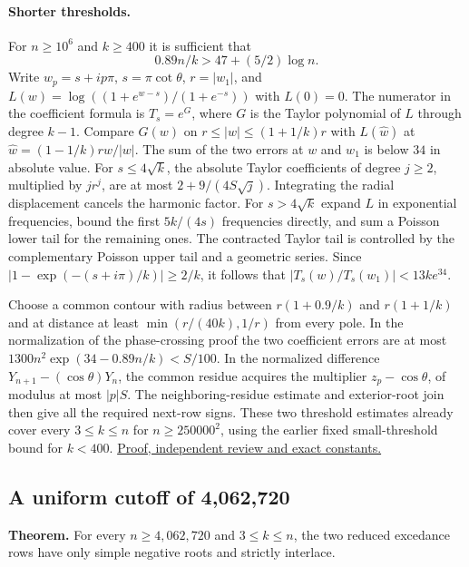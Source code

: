 \paragraph{Shorter thresholds.}
For $n\ge10^6$ and $k\ge400$ it is sufficient that
\[
0.89n/k>47+(5/2)\log n .
\]
Write $w_p=s+ip\pi$, $s=\pi\cot\theta$, $r=|w_1|$, and
$L(w)=\log((1+e^{w-s})/(1+e^{-s}))$ with $L(0)=0$.
The numerator in the coefficient formula is $T_s=e^G$, where $G$ is the
Taylor polynomial of $L$ through degree $k-1$. Compare $G(w)$ on
$r\le|w|\le(1+1/k)r$ with $L(\widehat w)$ at
$\widehat w=(1-1/k)rw/|w|$.  The sum of the two errors at $w$ and $w_1$
is below $34$ in absolute value. For $s\le4\sqrt k$, the absolute Taylor
coefficients of degree $j\ge2$, multiplied by $jr^j$, are at most
$2+9/(4S\sqrt{j})$. Integrating the radial displacement cancels the
harmonic factor. For $s>4\sqrt k$ expand $L$ in exponential frequencies,
bound the first $5k/(4s)$ frequencies directly, and sum a Poisson lower
tail for the remaining ones. The contracted Taylor tail is controlled by
the complementary Poisson upper tail and a geometric series.
Since $|1-\exp(-(s+i\pi)/k)|\ge2/k$, it follows that
$|T_s(w)/T_s(w_1)|<13ke^{34}$.

Choose a common contour with radius between $r(1+0.9/k)$ and $r(1+1/k)$
and at distance at least $\min(r/(40k),1/r)$ from every pole. In the
normalization of the phase-crossing proof the two coefficient errors are at
most $1300n^2\exp(34-0.89n/k)<S/100$. In the normalized difference $Y_{n+1}-(\cos\theta)Y_n$,
the common residue acquires the multiplier $z_p-\cos\theta$, of modulus at most $|p|S$.
The neighboring-residue estimate and exterior-root join then give all the
required next-row signs. These two threshold estimates already cover every
$3\le k\le n$ for $n\ge250000^2$, using the earlier fixed small-threshold
bound for $k<400$.
\href{https://github.com/ProgramComputer/open-math-research/blob/main/topics/long-cycle-excedances/radial-taylor.md}{Proof, independent review and exact constants.}

\subsection{A uniform cutoff of 4,062,720}

\textbf{Theorem.}
For every $n\ge4{,}062{,}720$ and $3\le k\le n$, the two reduced
excedance rows have only simple negative roots and strictly interlace.

